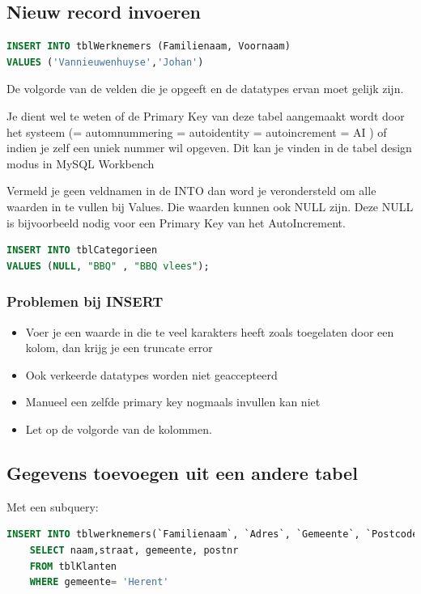 \documentclass{article}
\begin{document}
\subsection{Nieuw record invoeren}
\begin{lstlisting}[language=SQL]
INSERT INTO tblWerknemers (Familienaam, Voornaam)
VALUES ('Vannieuwenhuyse','Johan')
\end{lstlisting}
De volgorde van de velden die je opgeeft en de datatypes ervan moet gelijk zijn.

Je dient wel te weten of de Primary Key van deze tabel aangemaakt wordt door het systeem 
(= automnummering = autoidentity = autoincrement = AI ) of indien je zelf een uniek nummer wil opgeven.
Dit kan je vinden in de tabel design modus in MySQL Workbench

Vermeld je geen veldnamen in de INTO dan word je verondersteld om alle waarden in te vullen bij Values. 
Die waarden kunnen ook NULL zijn. Deze NULL is bijvoorbeeld nodig voor een Primary Key van het AutoIncrement.

\begin{lstlisting}[language=SQL]
INSERT INTO tblCategorieen
VALUES (NULL, "BBQ" , "BBQ vlees");
\end{lstlisting}

\subsubsection{Problemen bij INSERT}
\begin{itemize}
    \item Voer je een waarde in die te veel karakters heeft zoals toegelaten door een kolom, dan krijg je een truncate error
    \item Ook verkeerde datatypes worden niet geaccepteerd
    \item Manueel een zelfde primary key nogmaals invullen kan niet
    \item Let op de volgorde van de kolommen.
\end{itemize}

\subsection{Gegevens toevoegen uit een andere tabel}
Met een subquery: 
\begin{lstlisting}[language=SQL]
INSERT INTO tblwerknemers(`Familienaam`, `Adres`, `Gemeente`, `Postcode`)
    SELECT naam,straat, gemeente, postnr
    FROM tblKlanten
    WHERE gemeente= 'Herent'
\end{lstlisting}
\end{document}
